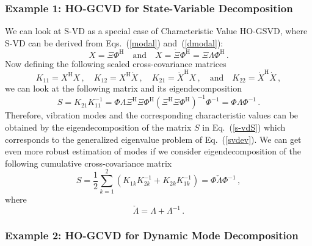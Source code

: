 \documentclass[10pt]{article}
\newcommand{\eq}[1]{Eq.\ (\ref{#1})}
\newcommand{\eqstwo}[2]{Eqs.\ (\ref{#1}) and~(\ref{#2})}
\begin{document}
\subsubsection{Example 1: HO-GCVD for State-Variable Decomposition}

We can look at S-VD as a special case of Characteristic Value HO-GSVD, where S-VD can be derived from \eqstwo{modal}{dmodal}:
\begin{equation}
    X = \Xi \Phi^\mathrm{H} \quad \mathrm{and} \quad \dot X = \dot \Xi \Phi^\mathrm{H} = \Xi \Lambda \Phi^\mathrm{H}\,.
\end{equation}
Now defining the following scaled cross-covariance matrices
\begin{equation}
    K_{11} = X^\mathrm{H} X\,, \quad  K_{12} = X^\mathrm{H} \dot X\,,\quad    K_{21} = \dot X^\mathrm{H} X\,, \quad \mathrm{and} \quad K_{22} = \dot X^\mathrm{H} \dot X\,,
\end{equation}
we can look at the following matrix and its eigendecomposition
\begin{equation}\label{s-vdS}
    S = K_{21} K_{11}^{-1}
          = \Phi \Lambda \Xi^\mathrm{H} \Xi \Phi^\mathrm{H}\left(\Xi^\mathrm{H} \Xi \Phi^\mathrm{H}\right)^{-1} \Phi^{-1} = \Phi \Lambda \Phi^{-1}\,.
\end{equation}     
Therefore, vibration modes and the corresponding characteristic values can be obtained by the eigendecomposition of the matrix $S$ in \eq{s-vdS} which corresponds to the generalized eigenvalue problem of \eq{svdev}.
We can get even more robust estimation of modes if we consider eigendecomposition of the following cumulative cross-covariance matrix
\begin{equation}
    S =\frac{1}{2} \sum_{k=1}^{2}  \left(K_{1k} K_{2k}^{-1} + K_{2k} K_{1k}^{-1} \right)= \Phi \check \Lambda \Phi^{-1}\,,
\end{equation}     
where 
\begin{equation}
    \check \Lambda = \Lambda+\Lambda^{-1}\,.
\end{equation}

\subsubsection{Example 2: HO-GCVD for Dynamic Mode Decomposition}
\end{document}
